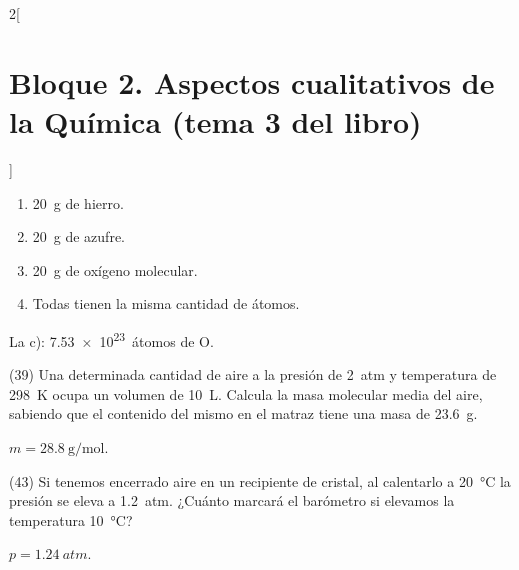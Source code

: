 \documentclass[10pt]{article}
\begin{document}
\begin{multicols}{2}[
    \section{Bloque 2. Aspectos cualitativos de la Química (tema 3 del libro)}
  ]
\begin{exercise}[
    tags    = {},
    topics  = {química,química básica},
    source  = {FQ 1B MGH 2016, p85, e26},
  ]
  \begin{enumerate}
    \item \SI{20}{\gram} de hierro.
    \item \SI{20}{\gram} de azufre.
    \item \SI{20}{\gram} de oxígeno molecular.
    \item Todas tienen la misma cantidad de átomos.
  \end{enumerate}
\end{exercise}

\begin{solution}
  La c): \SI{7.53e23}{átomos} de O.
\end{solution}





\begin{exercise}[
    tags    = {},
    topics  = {química,química básica},
    source  = {FQ 1B MGH 2016, p85, e26},
  ]

  (39) Una determinada cantidad de aire a la presión de \SI{2}{atm} y
  temperatura de \SI{298}{\kelvin} ocupa un volumen de \SI{10}{\liter}. Calcula la masa molecular media del aire, sabiendo que el contenido del
  mismo en el matraz tiene una masa de \SI{23.6}{\gram}.
\end{exercise}

\begin{solution}
  \( m = \SI{28.8}{\gram\per\mole} \).
\end{solution}





\begin{exercise}[
    tags    = {},
    topics  = {química,química básica},
    source  = {FQ 1B MGH 2016, p85, e26},
  ]

  (43) Si tenemos encerrado aire en un recipiente de cristal, al
  calentarlo a \SI{20}{\celsius} la presión se eleva a \SI{1.2}{atm}. ¿Cuánto marcará el barómetro si elevamos la temperatura \SI{10}{\celsius}?
\end{exercise}

\begin{solution}
  \( p = \SI{1.24}{atm} \).
\end{solution}





\begin{exercise}[
    tags    = {},
    topics  = {química,química básica},
    source  = {FQ 1B MGH 2016, p85, e26},
  ]


\end{exercise}
\end{multicols}
\end{document}
